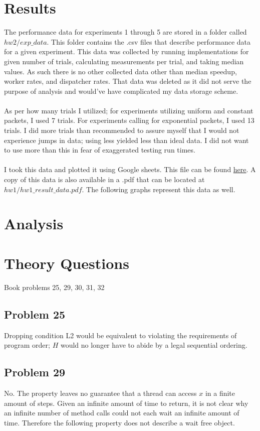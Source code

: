 \documentclass[]{article}
\begin{document}
\section{Results}
The performance data for experiments 1 through 5 are stored in a folder called $hw2/exp\_data$. This folder contains the .csv files that describe performance data for a given experiment. This data was collected by running implementations for given number of trials, calculating measurements per trial, and taking median values. As such there is no other collected data other than median speedup, worker rates, and dispatcher rates. That data was deleted as it did not serve the purpose of analysis and would've have complicated my data storage scheme.
\\\\
As per how many trials I utilized; for experiments utilizing uniform and constant packets, I used 7 trials. For experiments calling for exponential packets, I used 13 trials. I did more trials than recommended to assure myself that I would not experience jumps in data; using less yielded less than ideal data. I did not want to use more than this in fear of exaggerated testing run times.
\\\\
I took this data and plotted it using Google sheets. This file can be found \href{https://docs.google.com/spreadsheets/d/1Vw1P-lnHN_f6wwxxaazGUFCf4o0oCOopKKm607_WKG0/edit?usp=sharing}{here}. A copy of this data is also available in a .pdf that can be located at $hw1/hw1\_result\_data.pdf$. The following graphs represent this data as well.

\section{Analysis}


\section{Theory Questions}
Book problems 25, 29, 30, 31, 32

\subsection{Problem 25}
Dropping condition L2 would be equivalent to violating the requirements of program order; $H$ would no longer have to abide by a legal sequential ordering.

\subsection{Problem 29}
No. The property leaves no guarantee that a thread can access $x$ in a finite amount of steps. Given an infinite amount of time to return, it is not clear why an infinite number of method calls could not each wait an infinite amount of time. Therefore the following property does not describe a wait free object.
\end{document}
